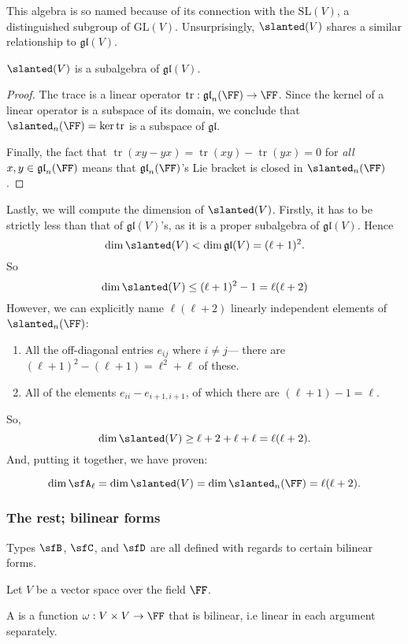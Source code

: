 \documentclass{article}
\DeclareMathOperator{\tr}{tr}
\newcommand*\GL{\ensuremath{\text{GL}}}
\newcommand*\SL{\ensuremath{\text{SL}}}
\newcommand*\gl{\ensuremath{\mathfrak{gl}}}
\let\sl\slanted
\newcommand*\sl{\ensuremath{\mathfrak{sl}}}
\begin{document}
This algebra is so named because of its connection with the  $\SL(V)$, a distinguished subgroup of $\GL(V)$.
Unsurprisingly, $\sl(V)$ shares a similar relationship to $\gl(V)$.

\begin{proposition}
    $\sl(V)$ is a subalgebra of $\gl(V)$.
\end{proposition}
\begin{proof}
    The trace is a linear operator $\tr: \gl_n(\FF) \to \FF$.
    Since the kernel of a linear operator is a subspace of its domain, we conclude that $\sl_n(\FF) = \ker \tr$ is a subspace of $\gl$.

    Finally, the fact that $\tr(xy - yx) = \tr(xy) - \tr(yx) = 0$ for \textit{all} $x,y \in \gl_n(\FF)$ means that $\gl_n(\FF)$'s Lie bracket is closed in $\sl_n(\FF)$.
\end{proof}

Lastly, we will compute the dimension of $\sl(V)$.
Firstly, it has to be strictly less than that of $\gl(V)$'s, as it is a proper subalgebra of $\gl(V)$.
Hence
\[
    \dim \sl(V) < \dim \gl(V) = (\ell+1)^2.
\]
So
\[
    \dim \sl(V) \leq (\ell+1)^2 - 1 = \ell(\ell+2)
\]
However, we can explicitly name $\ell(\ell+2)$ linearly independent elements of $\sl_n(\FF)$:
\begin{enumerate}
    \item 
        All the off-diagonal entries $e_{ij}$ where $i \neq j$--- there are $(\ell+1)^2 - (\ell + 1) = \ell^2 + \ell$ of these.
    \item 
        All of the elements $e_{ii} - e_{i+1,i+1}$, of which there are $(\ell + 1) -1 = \ell$. 
\end{enumerate}
So,
\[
    \dim \sl(V) \geq \ell+2 + \ell + \ell = \ell(\ell + 2).
\]
And, putting it together, we have proven:
\begin{proposition}
    \[
        \dim \sfA_\ell
        =
        \dim \sl(V)
        =
        \dim \sl_n(\FF)
        =
        \ell(\ell+2).
    \]
\end{proposition}

\subsubsection{The rest; bilinear forms}

Types $\sfB$, $\sfC$, and $\sfD$ are all defined with regards to certain bilinear forms.

\begin{definition}
    Let $V$ be a vector space over the field $\FF$.

    A  is a function $\omega: V \times V \to \FF$ that is bilinear, i.e linear in each argument separately. 
\end{definition}
\end{document}
